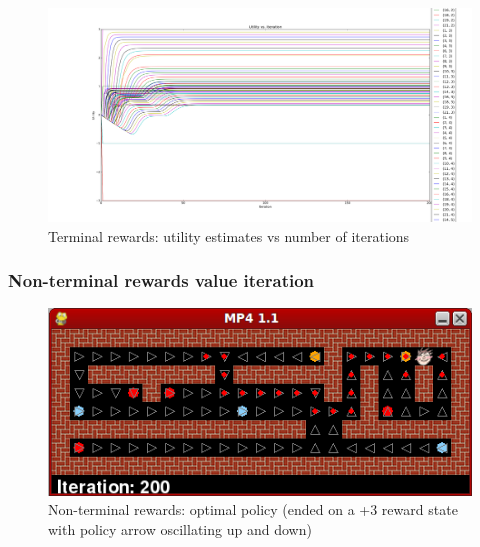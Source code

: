 \begin{figure}[H]
  \centering
  \includegraphics[width=\linewidth]{graphics/term_11ec_util_iters.png}
  \caption{Terminal rewards: utility estimates vs number of iterations}
\end{figure}

\subsubsection{Non-terminal rewards value iteration}
\begin{figure}[H]
  \centering
  \includegraphics[width=0.5\linewidth]{graphics/inf_11ec_opti_policy.png}
  \caption{Non-terminal rewards: optimal policy (ended on a +3 reward state with policy arrow oscillating up and down)}
\end{figure}

